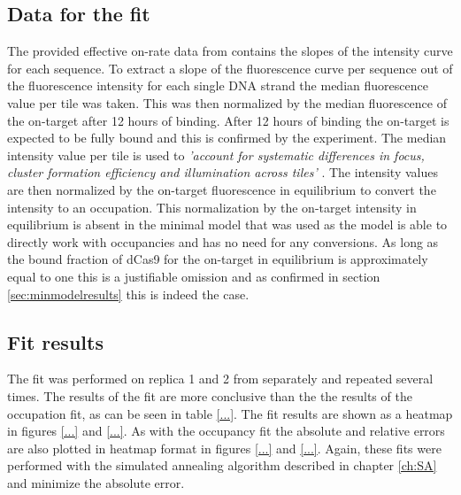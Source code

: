 \subsection{Data for the fit}
\label{sec:DetailsDataOnRate}
The provided effective on-rate data from \cite{PNAS} contains the slopes of the intensity curve for each sequence. To extract a slope of the fluorescence curve per sequence out of the fluorescence intensity for each single DNA strand the median fluorescence value per tile was taken. This was then normalized by the median fluorescence of the on-target after 12 hours of binding. After 12 hours of binding the on-target is expected to be fully bound and this is confirmed by the experiment. The median intensity value per tile is used to \textit{'account for systematic differences in focus, cluster formation efficiency and illumination across tiles'} \citep{PNAS}. The intensity values are then normalized by the on-target fluorescence in equilibrium to convert the intensity to an occupation. This normalization by the on-target intensity in equilibrium is absent in the minimal model that was used as the model is able to directly work with occupancies and has no need for any conversions. As long as the bound fraction of dCas9 for the on-target in equilibrium is approximately equal to one this is a justifiable omission and as confirmed in section \ref{sec:minmodelresults} this is indeed the case.

\subsection{Fit results}
The fit was performed on replica 1 and 2 from \citep{PNAS} separately and repeated several times. The results of the fit are more conclusive than the the results of the occupation fit, as can be seen in table \ref{...}. The fit results are shown as a heatmap in figures \ref{...} and \ref{...}. As with the occupancy fit the absolute and relative errors are also plotted in heatmap format in figures \ref{...} and \ref{...}. Again, these fits were performed with the simulated annealing algorithm described in chapter \ref{ch:SA} and minimize the absolute error.



